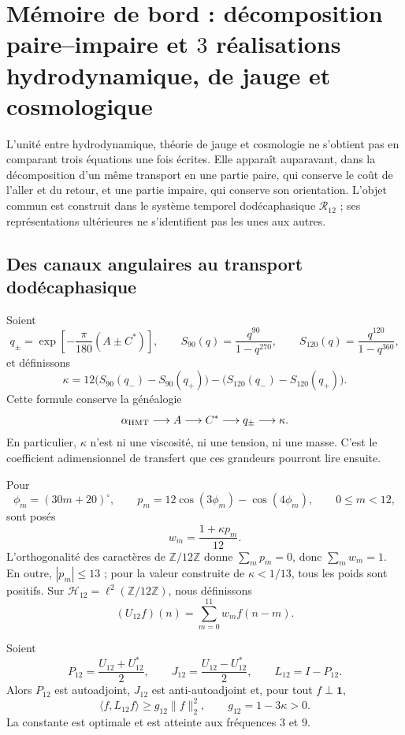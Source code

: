 \chapter{Mémoire de bord : décomposition paire--impaire et \(3\) réalisations hydrodynamique, de jauge et cosmologique}
\label{chap:memoria-tres-lecturas-rev6}

L'unité entre hydrodynamique, théorie de jauge et cosmologie ne s'obtient pas
en comparant trois équations une fois écrites. Elle apparaît auparavant, dans la
décomposition d'un même transport en une partie paire, qui conserve le coût
de l'aller et du retour, et une partie impaire, qui conserve son orientation.
L'objet commun est construit dans le système temporel dodécaphasique \(\mathcal R_{12}\) ; ses représentations
ultérieures ne s'identifient pas les unes aux autres.

\section{Des canaux angulaires au transport dodécaphasique}

Soient
\[
 q_\pm=\exp\!\left[-\frac{\pi}{180}(A\pm C^\ast)\right],
 \qquad
 S_{90}(q)=\frac{q^{90}}{1-q^{270}},
 \qquad
 S_{120}(q)=\frac{q^{120}}{1-q^{360}},
\]
et définissons
\[
 \kappa
 =12\bigl(S_{90}(q_-)-S_{90}(q_+)\bigr)
 -\bigl(S_{120}(q_-)-S_{120}(q_+)\bigr).
\]
Cette formule conserve la généalogie
\[
 \alpha_{\rm HMT}\longrightarrow A
 \longrightarrow C^\ast\longrightarrow q_\pm
 \longrightarrow\kappa.
\]
En particulier, \(\kappa\) n'est ni une viscosité, ni une tension, ni une masse. C'est
le coefficient adimensionnel de transfert que ces grandeurs pourront lire
ensuite.

Pour
\[
 \phi_m=(30m+20)^\circ,\qquad
 p_m=12\cos(3\phi_m)-\cos(4\phi_m),
 \qquad 0\leq m<12,
\]
sont posés
\[
 w_m=\frac{1+\kappa p_m}{12}.
\]
L'orthogonalité des caractères de
\(\mathbb Z/12\mathbb Z\) donne
\(\sum_m p_m=0\), donc \(\sum_mw_m=1\). En outre,
\(|p_m|\leq13\) ; pour la valeur construite de \(\kappa<1/13\), tous les
poids sont positifs. Sur
\(\mathcal H_{12}=\ell^2(\mathbb Z/12\mathbb Z)\), nous définissons
\[
 (U_{12}f)(n)=\sum_{m=0}^{11}w_mf(n-m).
\]

\begin{theorem}
\label{thm:reserva-dodecafasica-rev6}
Soient
\[
 P_{12}=\frac{U_{12}+U_{12}^{\ast}}2,\qquad
 J_{12}=\frac{U_{12}-U_{12}^{\ast}}2,\qquad
 L_{12}=I-P_{12}.
\]
Alors \(P_{12}\) est autoadjoint, \(J_{12}\) est
anti-autoadjoint et, pour tout \(f\perp\mathbf1\),
\[
 \boxed{\;
 \langle f,L_{12}f\rangle
 \geq g_{12}\|f\|_2^2,\qquad
 g_{12}=1-3\kappa>0.
 \;}
\]
La constante est optimale et est atteinte aux fréquences \(3\) et \(9\).
\end{theorem}


